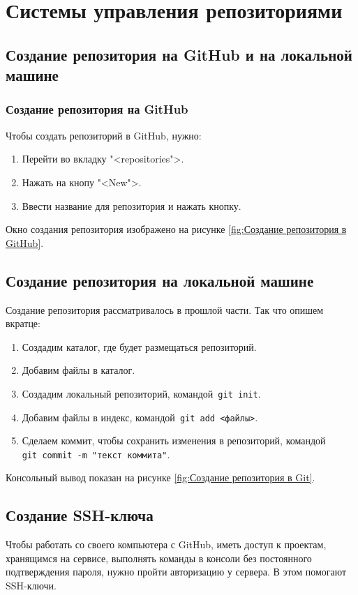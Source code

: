\chapter{Системы управления репозиториями}

\section{Создание репозитория на GitHub и на локальной машине}
\subsection{Создание репозитория на GitHub}
Чтобы создать репозиторий в GitHub, нужно:
\begin{enumerate}
    \item Перейти во вкладку "<repositories">.
    \item Нажать на кнопу "<New">.
    \item Ввести название для репозитория и нажать кнопку.
\end{enumerate}
Окно создания репозитория изображено на рисунке \ref{fig:Создание репозитория в GitHub}.

\section{Создание репозитория на локальной машине}
Создание репозитория рассматривалось в прошлой части.
Так что опишем вкратце:
\begin{enumerate}
    \item Создадим каталог, где будет размещаться репозиторий.
    \item Добавим файлы в каталог.
    \item Создадим локальный репозиторий, командой~\texttt{git~init}.
    \item Добавим файлы в индекс, командой~\texttt{git~add~<файлы>}.
    \item Сделаем коммит, чтобы сохранить изменения в репозиторий,
    командой \texttt{git~commit~-m~"текст~коммита"}.
\end{enumerate}
Консольный вывод показан на рисунке \ref{fig:Создание репозитория в Git}.

\section{Создание SSH-ключа}
Чтобы работать со своего компьютера с GitHub, иметь доступ к проектам,
хранящимся на сервисе, выполнять команды в консоли без постоянного
подтверждения пароля, нужно пройти авторизацию у сервера.
В этом помогают SSH-ключи.


